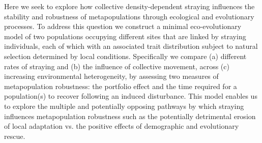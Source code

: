 \documentclass[twocolumn,preprintnumbers,amsmath,amssymb,superscriptaddress]{revtex4}
\begin{document}

% 

Here we seek to explore how collective density-dependent straying influences the stability and robustness of metapopulations through ecological and evolutionary processes.
To address this question we construct a minimal eco-evolutionary model of two populations occupying different sites that are linked by straying individuals, each of which with an associated trait distribution subject to natural selection determined by local conditions.
Specifically we compare (a) different rates of straying and (b) the influence of collective movement, across (c) increasing environmental heterogeneity, by assessing two measures of metapopulation robustness: the portfolio effect and the time required for a population(s) to recover following an induced disturbance. 
This model enables us to explore the multiple and potentially opposing pathways by which straying influences metapopulation robustness such as the potentially detrimental erosion of local adaptation vs. the positive effects of demographic and evolutionary rescue.
\end{document}
